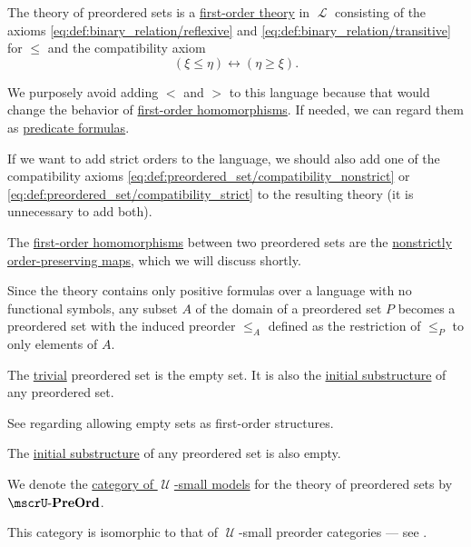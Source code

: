 \begin{definition}
\begin{thmenum}
    The theory of preordered sets is a \hyperref[def:first_order_theory]{first-order theory} in \( \mscrL \) consisting of the axioms \eqref{eq:def:binary_relation/reflexive} and \eqref{eq:def:binary_relation/transitive} for \( \leq \) and the compatibility axiom
    \begin{equation}\label{eq:def:preordered_set/theory}
      (\xi \leq \eta) \leftrightarrow (\eta \geq \xi).
    \end{equation}

    We purposely avoid adding \( < \) and \( > \) to this language because that would change the behavior of \hyperref[def:first_order_homomorphism]{first-order homomorphisms}. If needed, we can regard them as \hyperref[rem:predicate_formula]{predicate formulas}.

    If we want to add strict orders to the language, we should also add one of the compatibility axioms \eqref{eq:def:preordered_set/compatibility_nonstrict} or \eqref{eq:def:preordered_set/compatibility_strict} to the resulting theory (it is unnecessary to add both).

     The \hyperref[def:first_order_homomorphism]{first-order homomorphisms} between two preordered sets are the \hyperref[def:order_homomorphism/increasing]{nonstrictly order-preserving maps}, which we will discuss shortly.

     Since the theory contains only positive formulas over a language with no functional symbols, any subset \( A \) of the domain of a preordered set \( P \) becomes a preordered set with the induced preorder \( \leq_A \) defined as the restriction of \( \leq_P \) to only elements of \( A \).

     The \hyperref[rem:trivial_structure]{trivial} preordered set is the empty set. It is also the \hyperref[thm:substructures_form_complete_lattice/bottom]{initial substructure} of any preordered set.

    See  regarding allowing empty sets as first-order structures.

     The \hyperref[thm:substructures_form_complete_lattice/bottom]{initial substructure} of any preordered set is also empty.

      We denote the \hyperref[def:category_of_small_first_order_models]{category of \( \mscrU \)-small models} for the theory of preordered sets by \( \ucat{PreOrd} \).

    This category is isomorphic to that of \( \mscrU \)-small preorder categories --- see .
  \end{thmenum}
\end{definition}


